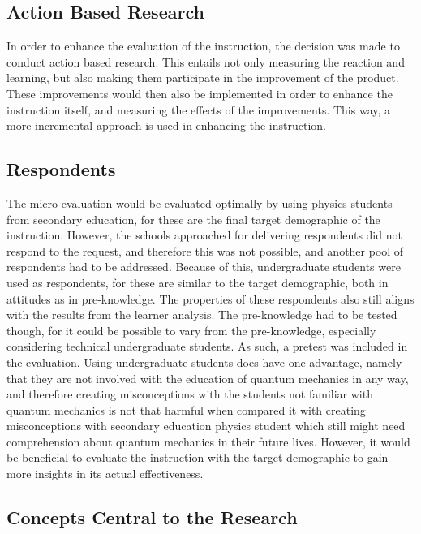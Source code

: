 \documentclass[11pt,twoside]{report} %
\begin{document}
\subsection{Action Based Research}

In order to enhance the evaluation of the instruction, the decision was made to conduct action based research. This entails not only measuring the reaction and learning, but also making them participate in the improvement of the product. These improvements would then also be implemented in order to enhance the instruction itself, and measuring the effects of the improvements. This way, a more incremental approach is used in enhancing the instruction.

\subsection{Respondents}

The micro-evaluation would be evaluated optimally by using physics students from secondary education, for these are the final target demographic of the instruction. However, the schools approached for delivering respondents did not respond to the request, and therefore this was not possible, and another pool of respondents had to be addressed. Because of this, undergraduate students were used as respondents, for these are similar to the target demographic, both in attitudes as in pre-knowledge. The properties of these respondents also still aligns with the results from the learner analysis. The pre-knowledge had to be tested though, for it could be possible to vary from the pre-knowledge, especially considering technical undergraduate students. As such, a pretest was included in the evaluation. Using undergraduate students does have one advantage, namely that they are not involved with the education of quantum mechanics in any way, and therefore creating misconceptions with the students not familiar with quantum mechanics is not that harmful when compared it with creating misconceptions with secondary education physics student which still might need comprehension about quantum mechanics in their future lives. However, it would be beneficial to evaluate the instruction with the target demographic to gain more insights in its actual effectiveness.

\subsection{Concepts Central to the Research}
\label{subsec:evaconcepts}
\end{document}
